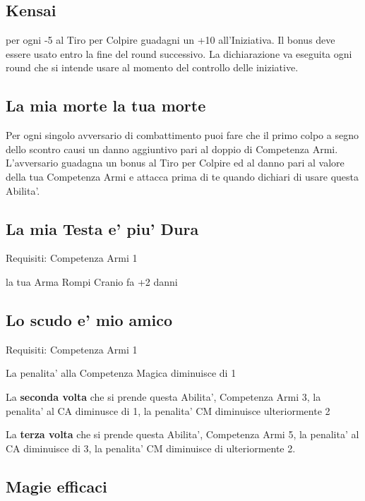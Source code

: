 \documentclass[a4paper,11pt,twoside,openany]{book}
\begin{document}
	\subsection{Kensai}
	
	per ogni -5 al Tiro per Colpire guadagni un +10 all'Iniziativa. Il bonus deve essere usato entro la fine del round successivo. La dichiarazione va eseguita ogni round che si intende usare al momento del controllo delle iniziative.
	
	\subsection{La mia morte la tua morte}
	
	Per ogni singolo avversario di combattimento puoi fare che il primo colpo a segno dello scontro causi un danno aggiuntivo pari al doppio di Competenza Armi. L'avversario guadagna un bonus al Tiro per Colpire ed al danno pari al valore della tua Competenza Armi e attacca prima di te quando dichiari di usare questa Abilita'.
	
	\subsection{La mia Testa e' piu' Dura}
	
	Requisiti: Competenza Armi 1
	
	la tua Arma Rompi Cranio fa +2 danni
	
	\subsection{Lo scudo e' mio amico}
	
	Requisiti: Competenza Armi 1
	
	La penalita' alla Competenza Magica diminuisce di 1
	
	La \textbf{seconda volta} che si prende questa Abilita', Competenza Armi 3, la penalita' al CA diminusce di 1, la penalita' CM diminuisce ulteriormente 2
	
	La \textbf{terza volta} che si prende questa Abilita', Competenza Armi 5, la penalita' al CA diminuisce di 3, la penalita' CM diminuisce di ulteriormente 2.
	
	\subsection{Magie efficaci}
	
\end{document}

